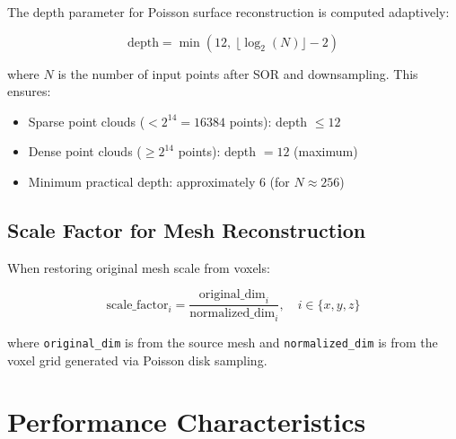 \documentclass[12pt,a4paper]{article}
\begin{document}
The depth parameter for Poisson surface reconstruction is computed adaptively:

\[
\text{depth} = \min\left(12, \ \lfloor \log_2(N) \rfloor - 2\right)
\]

where $N$ is the number of input points after SOR and downsampling. This ensures:
\begin{itemize}
  \item Sparse point clouds ($< 2^{14} = 16384$ points): depth $\leq 12$
  \item Dense point clouds ($\geq 2^{14}$ points): depth $= 12$ (maximum)
  \item Minimum practical depth: approximately 6 (for $N \approx 256$)
\end{itemize}

\subsection{Scale Factor for Mesh Reconstruction}

When restoring original mesh scale from voxels:

\[
\text{scale\_factor}_i = \frac{\text{original\_dim}_i}{\text{normalized\_dim}_i}, \quad i \in \{x, y, z\}
\]

where \texttt{original\_dim} is from the source mesh and \texttt{normalized\_dim} is from the voxel grid generated via Poisson disk sampling.

\newpage

\section{Performance Characteristics}
\end{document}
